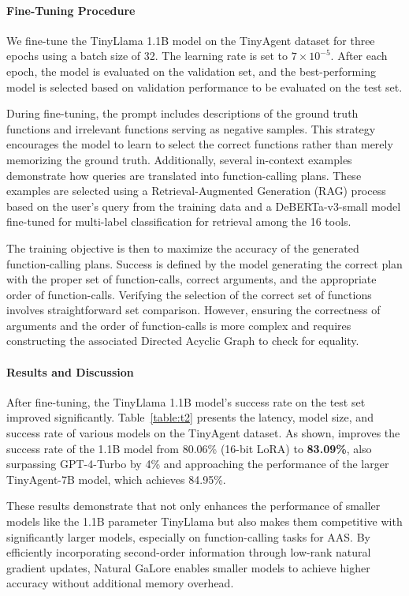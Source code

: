 \paragraph{Fine-Tuning Procedure}

We fine-tune the TinyLlama 1.1B model on the TinyAgent dataset for three epochs using a batch size of 32. The learning rate is set to \(7 \times 10^{-5}\). After each epoch, the model is evaluated on the validation set, and the best-performing model is selected based on validation performance to be evaluated on the test set.

During fine-tuning, the prompt includes descriptions of the ground truth functions and irrelevant functions serving as negative samples. This strategy encourages the model to learn to select the correct functions rather than merely memorizing the ground truth. Additionally, several in-context examples demonstrate how queries are translated into function-calling plans. These examples are selected using a Retrieval-Augmented Generation (RAG) process based on the user's query from the training data and a DeBERTa-v3-small model \citep{he2021debertav3} fine-tuned for multi-label classification for retrieval among the 16 tools.

The training objective is then to maximize the accuracy of the generated function-calling plans. Success is defined by the model generating the correct plan with the proper set of function-calls, correct arguments, and the appropriate order of function-calls. Verifying the selection of the correct set of functions involves straightforward set comparison. However, ensuring the correctness of arguments and the order of function-calls is more complex and requires constructing the associated Directed Acyclic Graph to check for equality.

\paragraph{Results and Discussion}



After fine-tuning, the TinyLlama 1.1B model's success rate on the test set improved significantly. Table~\ref{table:t2} presents the latency, model size, and success rate of various models on the TinyAgent dataset. As shown, \textit{\lowrank} improves the success rate of the 1.1B model from 80.06\% (16-bit LoRA) to \textbf{83.09\%}, also surpassing GPT-4-Turbo by 4\% and approaching the performance of the larger TinyAgent-7B model, which achieves 84.95\%.

These results demonstrate that \textit{\lowrank} not only enhances the performance of smaller models like the 1.1B parameter TinyLlama but also makes them competitive with significantly larger models, especially on function-calling tasks for AAS. By efficiently incorporating second-order information through low-rank natural gradient updates, Natural GaLore enables smaller models to achieve higher accuracy without additional memory overhead.